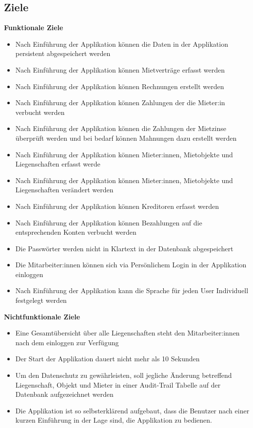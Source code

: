 \subsection{Ziele}
\textbf{Funktionale Ziele}
\begin{itemize}
  \item Nach Einführung der Applikation können die Daten in der Applikation persistent abgespeichert werden
  \item Nach Einführung der Applikation können Mietverträge erfasst werden
  \item Nach Einführung der Applikation können Rechnungen erstellt werden
  \item Nach Einführung der Applikation können Zahlungen der die Mieter:in verbucht werden
  \item Nach Einführung der Applikation können die Zahlungen der Mietzinse überprüft werden und bei bedarf können Mahnungen dazu erstellt werden
  \item Nach Einführung der Applikation können Mieter:innen, Mietobjekte und Liegenschaften erfasst werde
  \item Nach Einführung der Applikation können Mieter:innen, Mietobjekte und Liegenschaften verändert werden
  \item Nach Einführung der Applikation können Kreditoren erfasst werden
  \item Nach Einführung der Applikation können Bezahlungen auf die entsprechenden Konten verbucht werden
  \item Die Passwörter werden nicht in Klartext in der Datenbank abgespeichert
  \item Die Mitarbeiter:innen können sich via Persönlichem Login in der Applikation einloggen
  \item Nach Einführung der Applikation kann die Sprache für jeden User Individuell festgelegt werden
\end{itemize}

\textbf{Nichtfunktionale Ziele}
\begin{itemize}
  \item Eine Gesamtübersicht über alle Liegenschaften steht den Mitarbeiter:innen nach dem einloggen zur Verfügung
  \item Der Start der Applikation dauert nicht mehr als 10 Sekunden
  \item Um den Datenschutz zu gewährleisten, soll jegliche Änderung betreffend Liegenschaft, Objekt und Mieter in einer Audit-Trail Tabelle auf der Datenbank aufgezeichnet werden
  \item Die Applikation ist so selbsterklärend aufgebaut, dass die Benutzer nach einer kurzen Einführung in der Lage sind, die Applikation zu bedienen.
\end{itemize}


